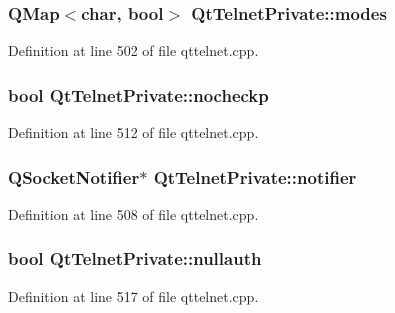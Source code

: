 \hypertarget{classQtTelnetPrivate_a19f4f4927ab411905a637e04694dd4b4}{
\subsubsection[{modes}]{\setlength{\rightskip}{0pt plus 5cm}QMap$<$char, bool$>$ {\bf QtTelnetPrivate::modes}}}
\label{classQtTelnetPrivate_a19f4f4927ab411905a637e04694dd4b4}


Definition at line 502 of file qttelnet.cpp.

\hypertarget{classQtTelnetPrivate_a2b680b042ddaada4aeb87b549669d979}{
\subsubsection[{nocheckp}]{\setlength{\rightskip}{0pt plus 5cm}bool {\bf QtTelnetPrivate::nocheckp}}}
\label{classQtTelnetPrivate_a2b680b042ddaada4aeb87b549669d979}


Definition at line 512 of file qttelnet.cpp.

\hypertarget{classQtTelnetPrivate_aacc76c154d962e6275960e4c48e503c9}{
\subsubsection[{notifier}]{\setlength{\rightskip}{0pt plus 5cm}QSocketNotifier$\ast$ {\bf QtTelnetPrivate::notifier}}}
\label{classQtTelnetPrivate_aacc76c154d962e6275960e4c48e503c9}


Definition at line 508 of file qttelnet.cpp.

\hypertarget{classQtTelnetPrivate_a0b40d5a76ef06d3a224ac4623883e4c5}{
\subsubsection[{nullauth}]{\setlength{\rightskip}{0pt plus 5cm}bool {\bf QtTelnetPrivate::nullauth}}}
\label{classQtTelnetPrivate_a0b40d5a76ef06d3a224ac4623883e4c5}


Definition at line 517 of file qttelnet.cpp.

